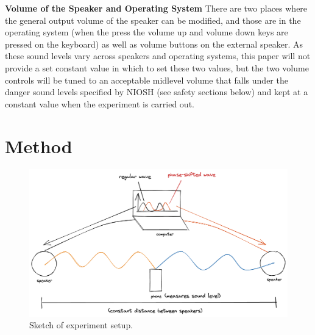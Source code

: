 \documentclass[index]{subfiles}
\begin{document}
\textbf{Volume of the Speaker and Operating System} There are two places where the general output volume of the speaker can be modified, and those are in the operating system (when the press the volume up and volume down keys are pressed on the keyboard) as well as volume buttons on the external speaker. As these sound levels vary across speakers and operating systems, this paper will not provide a set constant value in which to set these two values, but the two volume controls will be tuned to an acceptable midlevel volume that falls under the danger sound levels specified by NIOSH (see safety sections below) and kept at a constant value when the experiment is carried out.

\section{Method}

\begin{figure}[H]
    \centering
    \includegraphics[scale=0.22]{res/sound_diagram.png}
    \caption{Sketch of experiment setup.}
\end{figure}
\end{document}
